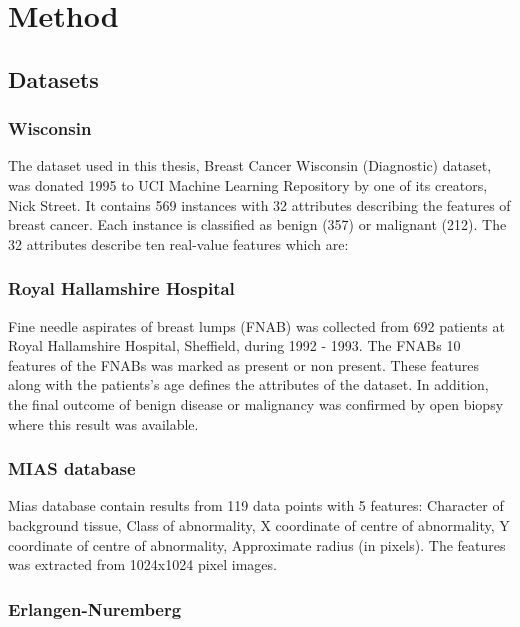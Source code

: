 \chapter{Method}

\section{Datasets}
\label{sec:Datasets}


\subsection{Wisconsin}

The dataset used in this thesis, Breast Cancer Wisconsin (Diagnostic) dataset, was donated 1995 to UCI  Machine Learning Repository \parencite{dua:2017} by one of its creators, Nick Street. It contains 569 instances with 32 attributes describing the features of breast cancer. Each instance is classified as benign (357) or malignant (212). The 32 attributes describe ten real-value features which are:

\subsection{Royal Hallamshire Hospital}

Fine needle aspirates of breast lumps (FNAB) was collected from 692 patients at Royal Hallamshire Hospital, Sheffield, during 1992 - 1993. The FNABs 10 features of the FNABs was marked as present or non present. These features along with the patients's age defines the attributes of the dataset. In addition, the final outcome of benign disease or malignancy was confirmed by open biopsy where this result was available.

\subsection{MIAS database}

Mias database contain results from 119 data points with 5 features: Character of background tissue, Class of abnormality, X coordinate of centre of abnormality, Y coordinate of centre of abnormality, Approximate radius (in pixels). The features was extracted from 1024x1024 pixel images.

\subsection{Erlangen-Nuremberg}

